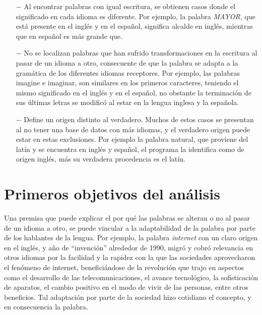 \begin{itemize}
	
	\item [$-$] Al encontrar palabras con igual escritura, se obtienen casos donde el significado en cada idioma es diferente.  Por ejemplo, la palabra  \textit{MAYOR}, que está presente en el inglés y en el español,  significa alcalde en inglés, mientras que en español es más grande que.
	
	\item [$-$] No se localizan palabras que han sufrido transformaciones en la escritura al pasar de un idioma a otro, consecuente de que la palabra se adapta a la gramática de los diferentes idiomas receptores.  Por ejemplo, las palabras imagine e imaginar, son similares en los primeros caracteres, teniendo el mismo significado en el inglés y en el español, no obstante la terminación de  sus últimas letras se modificó al estar en  la lengua inglesa y la española. 
	
	\item [$-$] Define un origen distinto al verdadero.  Muchos de estos casos se presentan al no tener una base de datos con más idiomas, y el verdadero origen puede estar en estas exclusiones. Por ejemplo la palabra natural, que proviene del latín y se encuentra en inglés y español,  el programa la identifica como  de origen inglés, más su verdadera procedencia es el latín. 
	
\end{itemize}


\newpage

\section{Primeros objetivos del análisis}

Una premisa que puede explicar el por qué las palabras se alteran o no al pasar de un idioma a otro, se puede vincular a la adaptabilidad de la palabra por parte de los hablantes de la lengua.  Por ejemplo, la palabra \textit{internet} con un claro origen en el inglés, y año de “invención” alrededor de 1990,  migró y cobró relevancia en otros idiomas por la facilidad y la rapidez con la que las sociedades  aprovecharon el fenómeno de internet, beneficiándose de la revolución que trajo en aspectos como el desarrollo de las telecomunicaciones,  el avance tecnológico,  la sofisticación de aparatos, el cambio positivo en el modo de vivir de las personas, entre otros beneficios.  Tal adaptación por parte de la sociedad hizo cotidiano el concepto, y en consecuencia la palabra.  


